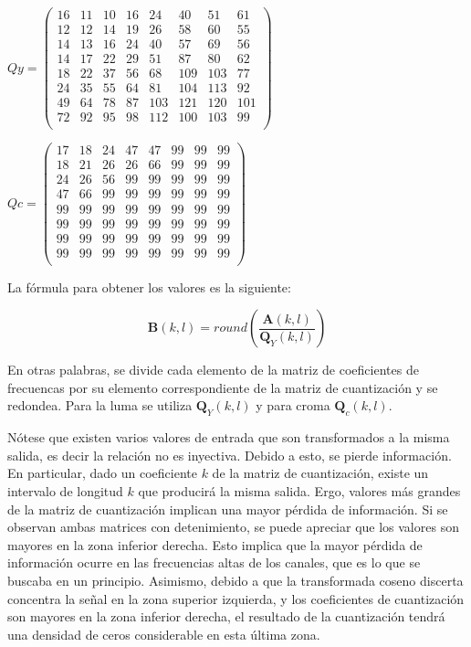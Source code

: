 \documentclass[%
	final,
	reprint,
	notitlepage,
	narroweqnarray,
	inline,
	twoside,
	invited
	]{ieee}
\begin{document}
\( Qy = 
\begin{pmatrix}
16 & 11 & 10 & 16 & 24 & 40 & 51 & 61 \\
12 & 12 & 14 & 19 & 26 & 58 & 60 & 55 \\
14 & 13 & 16 & 24 & 40 & 57 & 69 & 56 \\ 
14 & 17 & 22 & 29 & 51 & 87 & 80 & 62 \\ 
18 & 22 & 37 & 56 & 68 & 109 & 103 & 77 \\
24 & 35 & 55 & 64 & 81 & 104 & 113 & 92  \\ 
49 & 64 & 78 & 87 & 103 & 121 & 120 & 101 \\
72 & 92 & 95 & 98 & 112 & 100 & 103 & 99 \\ 
\end{pmatrix}\)
\par
\( Qc = 
\begin{pmatrix}

17 & 18 & 24 & 47 & 47 & 99 & 99 & 99 \\
18 & 21 & 26 & 26 & 66 & 99 & 99 & 99 \\
24 & 26 & 56 & 99 & 99 & 99 & 99 & 99 \\ 
47 & 66 & 99 & 99 & 99 & 99 & 99 & 99 \\ 
99 & 99 & 99 & 99 & 99 & 99 & 99 & 99 \\
99 & 99 & 99 & 99 & 99 & 99 & 99 & 99 \\
99 & 99 & 99 & 99 & 99 & 99 & 99 & 99 \\
99 & 99 & 99 & 99 & 99 & 99 & 99 & 99 \\
\end{pmatrix}\)

La fórmula para obtener los valores es la siguiente:

\begin{equation}
\label{eqCuantizacion}
\mathbf{B}(k,l)=round\left(\frac{\mathbf{A}(k,l)}{\mathbf{Q}_Y(k,l)}\right)
\end{equation}

\par En otras palabras, se divide cada elemento de la matriz de coeficientes de frecuencas por su elemento 
correspondiente de la matriz de cuantización y se redondea. Para la luma se utiliza $\mathbf{Q}_Y(k,l)$ y para 
croma $\mathbf{Q}_c(k,l)$.
\par Nótese que existen varios valores de entrada que son transformados a la misma salida, es decir la relación 
no es inyectiva. Debido a esto, se pierde información. En particular, dado un coeficiente $k$ de la matriz 
de cuantización, existe un intervalo de longitud $k$ que producirá la misma salida. Ergo, 
valores más grandes de la matriz de cuantización implican una mayor pérdida de información. Si se observan ambas 
matrices con detenimiento, se puede apreciar que los valores son mayores en la zona inferior derecha. Esto 
implica que la mayor pérdida de información ocurre en las frecuencias altas de los canales, que es lo que se 
buscaba en un principio.  Asimismo, debido a que la transformada coseno discerta concentra la señal en la zona 
superior izquierda, y los coeficientes de cuantización son mayores en la zona inferior derecha, el resultado de la 
cuantización tendrá una densidad de ceros considerable en esta última zona.
\end{document}
